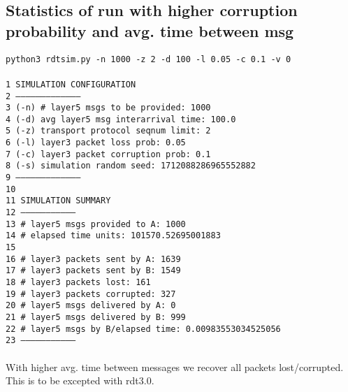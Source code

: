 \documentclass{article}
\begin{document}
\subsection{Statistics of run with higher corruption probability and avg. time between msg}
\hspace*{10mm} \texttt{python3 rdtsim.py -n 1000 -z 2 -d 100 -l 0.05 -c 0.1 -v 0}
\texttt{\\\\1 SIMULATION CONFIGURATION\\
2 --------------------------------------\\
3 (-n) \# layer5 msgs to be provided:      1000\\
4 (-d) avg layer5 msg interarrival time:  100.0\\
5 (-z) transport protocol seqnum limit:   2\\
6 (-l) layer3 packet loss prob:           0.05\\
7 (-c) layer3 packet corruption prob:     0.1\\
8 (-s) simulation random seed:            1712088286965552882\\
9 --------------------------------------\\
10\\
11 SIMULATION SUMMARY\\
12 --------------------------------\\
13 \# layer5 msgs provided to A:      1000\\
14 \# elapsed time units:             101570.52695001883\\
15\\
16 \# layer3 packets sent by A:       1639\\
17 \# layer3 packets sent by B:       1549\\
18 \# layer3 packets lost:            161\\
19 \# layer3 packets corrupted:       327\\
20 \# layer5 msgs delivered by A:     0\\
21 \# layer5 msgs delivered by B:     999\\
22 \# layer5 msgs by B/elapsed time:  0.00983553034525056\\
23 --------------------------------\\
}
\\With higher avg. time between messages we recover all packets lost/corrupted. This is to be excepted with rdt3.0.
\\\\
\end{document}

